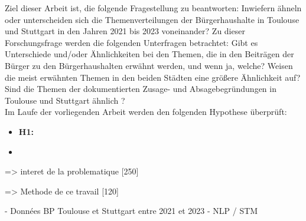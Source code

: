 Ziel dieser Arbeit ist, die folgende Fragestellung zu beantworten: 
    Inwiefern ähneln oder unterscheiden sich die Themenverteilungen der Bürgerhaushalte in Toulouse und Stuttgart in den Jahren 2021 bis 2023 voneinander?
Zu dieser Forschungsfrage werden die folgenden Unterfragen betrachtet: 
    Gibt es Unterschiede und/oder Ähnlichkeiten bei den Themen, die in den Beiträgen der Bürger zu den Bürgerhaushalten erwähnt werden, und wenn ja, welche?
    Weisen die meist erwähnten Themen in den beiden Städten eine größere Ähnlichkeit auf?
    Sind die Themen der dokumentierten Zusage- und Absagebegründungen in Toulouse und Stuttgart ähnlich ?\\

Im Laufe der vorliegenden Arbeit werden den folgenden Hypothese überprüft:

\begin{itemize}
    \item \textbf{H1:} 
    \item  
\end{itemize}



=> interet de la problematique [250]





=> Methode de ce travail [120]





- Données BP Toulouse et Stuttgart entre 2021 et 2023
- NLP / STM